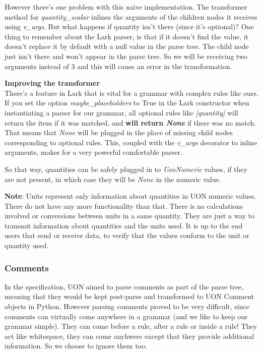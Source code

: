 \documentclass[12pt]{article}
\begin{document}
However there's one problem with this naive implementation. The transformer method for \emph{quantity\_scalar} inlines the arguments of the children nodes it receives using \emph{v\_args}. But what happens if quantity isn't there (since it's optional)? One thing to remember about the Lark parser, is that if it doesn't find the value, it doesn't replace it by default with a null value in the parse tree. The child node just isn't there and won't appear in the parse tree. So we will be receiving two arguments instead of 3 and this will cause an error in the transformation.
\hfill\break

\textbf{Improving the transformer} \\
There's a feature in Lark that is vital for a grammar with complex rules like ours. If you set the option \emph{maybe\_placeholders} to True in the Lark constructor when instantiating a parser for our grammar, all optional rules like \emph{[quantity]} will return the item if it was matched, and \textbf{will return \emph{None}} if there was no match. That means that \emph{None} will be plugged in the place of missing child nodes corresponding to optional rules. This, coupled with the \emph{v\_args} decorator to inline arguments, makes for a very powerful comfortable parser.

So that way, quantities can be safely plugged in to \emph{UonNumeric} values, if they are not present, in which case they will be \emph{None} in the numeric value.

\textbf{Note}: Units represent only information about quantities in UON numeric values. There do not have any more functionality than that. There is no calculations involved or conversions between units in a same quantity. They are just a way to transmit information about quantities and the units used. It is up to the end users that send or receive data, to verify that the values conform to the unit or quantity used.

\subsubsection{Comments}
In the specification, UON aimed to parse comments as part of the parse tree, meaning that they would be kept post-parse and transformed to UON Comment objects in Python. However parsing comments proved to be very difficult, since comments can virtually come anywhere in a grammar (and we like to keep our grammar simple). They can come before a rule, after a rule or inside a rule! They act like whitespace, they can come anyhwere except that they provide additional information. So we choose to ignore them too.
\end{document}
